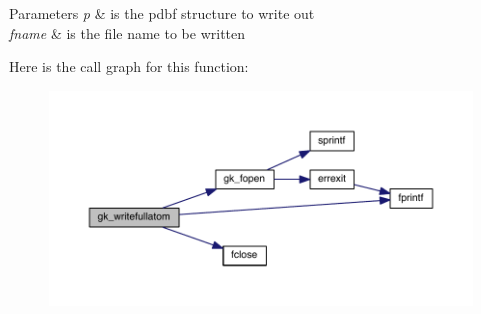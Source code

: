 \begin{DoxyParams}{Parameters}
{\em p} & is the pdbf structure to write out \\
\hline
{\em fname} & is the file name to be written \\
\hline
\end{DoxyParams}
Here is the call graph for this function\+:\nopagebreak
\begin{figure}[H]
\begin{center}
\leavevmode
\includegraphics[width=350pt]{a00125_a786192984ea62e6824ae9a2d1b902574_cgraph}
\end{center}
\end{figure}
